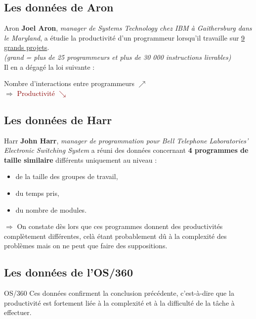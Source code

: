 \documentclass{beamer}
\newcommand{\red}[1]{\textcolor{darkred}{#1}}
\begin{document}
\subsection{Les données de Aron}
\begin{frame}{Aron}
\textbf{Joel Aron}, \textit{manager de Systems Technology chez IBM à Gaithersburg dans le Maryland}, a étudie la productivité d'un 
programmeur lorsqu'il travaille sur \underline{9 grands projets}.\\
\textit{(grand = plus de 25 programmeurs et plus de 30 000 instructions livrables)}\\
$ $\\
Il en a dégagé la loi suivante : \\
\begin{center}Nombre d'interactions entre programmeurs $\nearrow$ \\ $\Rightarrow$ \red{Productivité $\searrow$}\end{center}
\end{frame}

\subsection{Les données de Harr}

\begin{frame}{Harr}
\textbf{John Harr}, \textit{manager de programmation pour Bell Telephone Laboratories' Electronic Switching System} a réuni des 
données concernant \textbf{4 programmes de taille similaire} différents uniquement au niveau :
\begin{itemize}
\item de la taille des groupes de travail,
\item du temps pris,
\item du nombre de modules.
\end{itemize}
$\Rightarrow$ On constate dès lors que ces programmes donnent des productivités complètement différentes, celà étant probablement 
dû à la complexité des problèmes mais on ne peut que faire des suppositions. 
\end{frame}

\subsection{Les données de l'OS/360}
\begin{frame}{OS/360}
Ces données confirment la conclusion précédente, c'est-à-dire que la productivité est fortement liée à la complexité et à la 
difficulté de la tâche à effectuer.
\end{frame}
\end{document}
